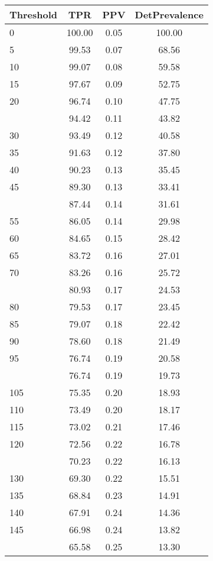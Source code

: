 \begin{table}[ht]
\centering
\begin{tabular}{lccc}
  \toprule
Threshold & TPR & PPV & DetPrevalence \\ 
  \midrule
0 & 100.00 & 0.05 & 100.00 \\ 
  5 & 99.53 & 0.07 & 68.56 \\ 
  10 & 99.07 & 0.08 & 59.58 \\ 
  15 & 97.67 & 0.09 & 52.75 \\ 
  20 & 96.74 & 0.10 & 47.75 \\ 
   \addlinespace
25 & 94.42 & 0.11 & 43.82 \\ 
  30 & 93.49 & 0.12 & 40.58 \\ 
  35 & 91.63 & 0.12 & 37.80 \\ 
  40 & 90.23 & 0.13 & 35.45 \\ 
  45 & 89.30 & 0.13 & 33.41 \\ 
   \addlinespace
50 & 87.44 & 0.14 & 31.61 \\ 
  55 & 86.05 & 0.14 & 29.98 \\ 
  60 & 84.65 & 0.15 & 28.42 \\ 
  65 & 83.72 & 0.16 & 27.01 \\ 
  70 & 83.26 & 0.16 & 25.72 \\ 
   \addlinespace
75 & 80.93 & 0.17 & 24.53 \\ 
  80 & 79.53 & 0.17 & 23.45 \\ 
  85 & 79.07 & 0.18 & 22.42 \\ 
  90 & 78.60 & 0.18 & 21.49 \\ 
  95 & 76.74 & 0.19 & 20.58 \\ 
   \addlinespace
100 & 76.74 & 0.19 & 19.73 \\ 
  105 & 75.35 & 0.20 & 18.93 \\ 
  110 & 73.49 & 0.20 & 18.17 \\ 
  115 & 73.02 & 0.21 & 17.46 \\ 
  120 & 72.56 & 0.22 & 16.78 \\ 
   \addlinespace
125 & 70.23 & 0.22 & 16.13 \\ 
  130 & 69.30 & 0.22 & 15.51 \\ 
  135 & 68.84 & 0.23 & 14.91 \\ 
  140 & 67.91 & 0.24 & 14.36 \\ 
  145 & 66.98 & 0.24 & 13.82 \\ 
   \addlinespace
150 & 65.58 & 0.25 & 13.30 \\ 

\end{tabular}
\end{table}
